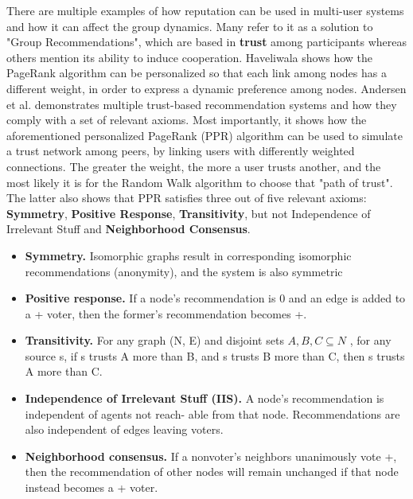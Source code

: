 There are multiple examples of how reputation can be used in multi-user systems and how it can affect the group dynamics. Many refer to it as a solution to "Group Recommendations", which are based in \textbf{trust} among participants whereas others mention its ability to induce cooperation. Haveliwala \cite{Haveliwala2003} shows how the PageRank algorithm can be personalized so that each link among nodes has a different weight, in order to express a dynamic preference among nodes. Andersen et al. \cite{Andersen2008} demonstrates multiple trust-based recommendation systems and how they comply with a set of relevant axioms. Most importantly, it shows how the aforementioned personalized PageRank (PPR) algorithm can be used to simulate a trust network among peers, by linking users with differently weighted connections. The greater the weight, the more a user trusts another, and the most likely it is for the Random Walk algorithm to choose that "path of trust". The latter also shows that PPR satisfies three out of five relevant axioms: \textbf{Symmetry}, \textbf{Positive Response}, \textbf{Transitivity}, but not Independence of Irrelevant Stuff and \textbf{Neighborhood Consensus}.
\begin{itemize}
    \item \textbf{Symmetry.} Isomorphic graphs result in corresponding isomorphic recommendations (anonymity), and the system is also symmetric
    \item \textbf{Positive response.} If a node’s recommendation is 0 and an edge is added to a + voter, then the former’s recommendation becomes +.
    \item \textbf{Transitivity.} For any graph (N, E) and disjoint sets $ A, B, C \subseteq N $ , for any source s, if s trusts A more than B, and s trusts B more than C, then s trusts A more than C.
    \item \textbf{Independence of Irrelevant Stuﬀ (IIS).} A node’s recommendation is independent of agents not reach- able from that node. Recommendations are also independent of edges leaving voters.
    \item \textbf{Neighborhood consensus.} If a nonvoter’s neighbors unanimously vote +, then the recommendation of other nodes will remain unchanged if that node instead becomes a + voter.
\end{itemize}

